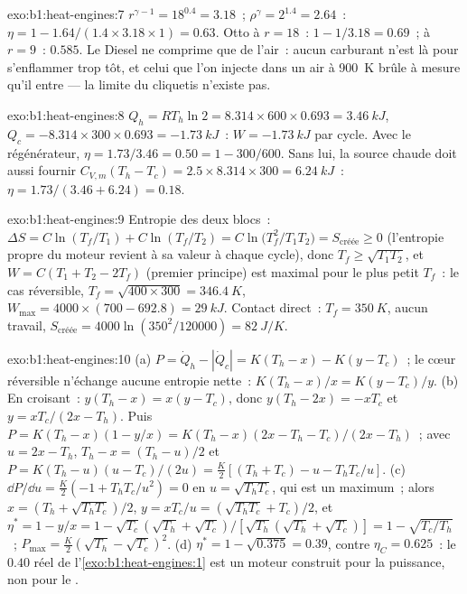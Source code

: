 \begin{solution}{exo:b1:heat-engines:7}
$r^{\gamma-1} = 18^{0.4} = 3.18$~; $\rho^\gamma = 2^{1.4} = 2.64$~: $\eta = 1 -
1.64/(1.4 \times 3.18 \times 1) = 0.63$. Otto à $r = 18$~: $1 - 1/3.18 = 0.69$~;
à $r = 9$~: $0.585$. Le Diesel ne comprime que de l'air~: aucun carburant n'est
là pour s'enflammer trop tôt, et celui que l'on injecte dans un air à \qty{900}{K}
brûle à mesure qu'il entre --- la limite du cliquetis n'existe pas.
\end{solution}

\begin{solution}{exo:b1:heat-engines:8}
$Q_h = RT_h\ln2 = 8.314 \times 600 \times 0.693 = \qty{3.46}{kJ}$, $Q_c = -8.314
\times 300 \times 0.693 = \qty{-1.73}{kJ}$~: $W = \qty{-1.73}{kJ}$ par cycle. Avec
le régénérateur, $\eta = 1.73/3.46 = 0.50 = 1 - 300/600$. Sans lui, la source
chaude doit aussi fournir $C_{V,m}(T_h - T_c) = 2.5 \times 8.314 \times 300 =
\qty{6.24}{kJ}$~: $\eta = 1.73/(3.46 + 6.24) = 0.18$.
\end{solution}

\begin{solution}{exo:b1:heat-engines:9}
Entropie des deux blocs~: $\Delta S = C\ln(T_f/T_1) + C\ln(T_f/T_2) =
C\ln\bigl(T_f^2/T_1T_2\bigr) = S_{\text{créée}} \geq 0$ (l'entropie propre du
moteur revient à sa valeur à chaque cycle), donc $T_f \geq \sqrt{T_1T_2}$, et
$W = C(T_1 + T_2 - 2T_f)$ (premier principe) est maximal pour le plus petit $T_f$~:
le cas réversible, $T_f = \sqrt{400 \times 300} = \qty{346.4}{K}$,
$W_{\max} = 4000 \times (700 - 692.8) = \qty{29}{kJ}$. Contact direct~: $T_f =
\qty{350}{K}$, aucun travail, $S_{\text{créée}} = 4000\ln(350^2/120000) =
\qty{82}{J/K}$.
\end{solution}

\begin{solution}{exo:b1:heat-engines:10}
(a) $P = \dot Q_h - |\dot Q_c| = K(T_h - x) - K(y - T_c)$~; le cœur réversible
n'échange aucune entropie nette~: $K(T_h - x)/x = K(y - T_c)/y$. (b) En croisant~:
$y(T_h - x) = x(y - T_c)$, donc $y(T_h - 2x) = -xT_c$ et $y = xT_c/(2x - T_h)$.
Puis $P = K(T_h - x)(1 - y/x) = K(T_h - x)(2x - T_h - T_c)/(2x - T_h)$~; avec
$u = 2x - T_h$, $T_h - x = (T_h - u)/2$ et $P = K(T_h - u)(u - T_c)/(2u) =
\tfrac{K}{2}[(T_h + T_c) - u - T_hT_c/u]$. (c) $\dd P/\dd u = \tfrac K2(-1 +
T_hT_c/u^2) = 0$ en $u = \sqrt{T_hT_c}$, qui est un maximum~; alors $x = (T_h +
\sqrt{T_hT_c})/2$, $y = xT_c/u = (\sqrt{T_hT_c} + T_c)/2$, et $\eta^\ast = 1 - y/x
= 1 - \sqrt{T_c}(\sqrt{T_h} + \sqrt{T_c})/[\sqrt{T_h}(\sqrt{T_h} + \sqrt{T_c})] = 1 -
\sqrt{T_c/T_h}$~; $P_{\max} = \tfrac K2(\sqrt{T_h} - \sqrt{T_c})^2$. (d)
$\eta^\ast = 1 - \sqrt{0.375} = 0.39$, contre $\eta_C = 0.625$~: le $0.40$ réel
de l'\cref{exo:b1:heat-engines:1} est un moteur construit pour la puissance,
non pour le .
\end{solution}

